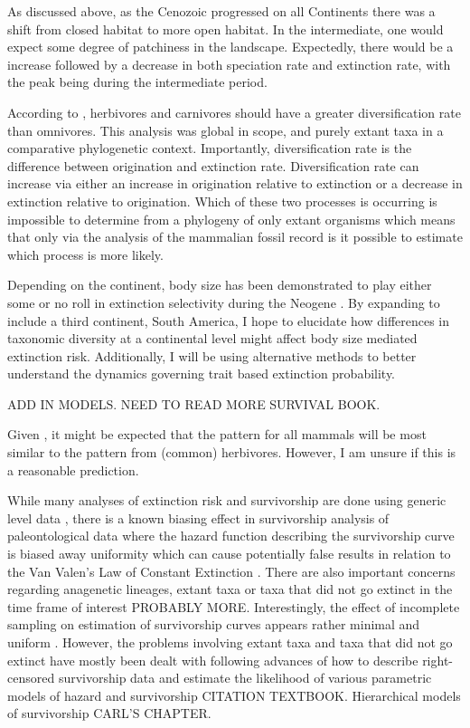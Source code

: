 \documentclass[12pt,letterpaper]{article}
\begin{document}
As discussed above, as the Cenozoic progressed on all Continents there was a shift from closed habitat to more open habitat. In the intermediate, one would expect some degree of patchiness in the landscape. Expectedly, there would be a increase followed by a decrease in both speciation rate and extinction rate, with the peak being during the intermediate period.

According to \citet{Price2012}, herbivores and carnivores should have a greater diversification rate than omnivores. This analysis was global in scope, and purely extant taxa in a comparative phylogenetic context. Importantly, diversification rate is the difference between origination and extinction rate. Diversification rate can increase via either an increase in origination relative to extinction or a decrease in extinction relative to origination. Which of these two processes is occurring is impossible to determine from a phylogeny of only extant organisms \citep{Rabosky2010a} which means that only via the analysis of the mammalian fossil record is it possible to estimate which process is more likely. 

Depending on the continent, body size has been demonstrated to play either some or no roll in extinction selectivity during the Neogene \citep{Tomiya2013,Liow2008,Liow2009}. By expanding to include a third continent, South America, I hope to elucidate how differences in taxonomic diversity at a continental level might affect body size mediated extinction risk. Additionally, I will be using alternative methods to better understand the dynamics governing trait based extinction probability.

ADD IN MODELS. NEED TO READ MORE SURVIVAL BOOK.

Given \citep{Jernvall2002}, it might be expected that the pattern for all mammals will be most similar to the pattern from (common) herbivores. However, I am unsure if this is a reasonable prediction.

While many analyses of extinction risk and survivorship are done using generic level data \citep{Tomiya2013,Liow2008,Harnik2013}, there is a known biasing effect in survivorship analysis of paleontological data where the hazard function describing the survivorship curve is biased away uniformity \citep{Raup1975,Sepkoski1975} which can cause potentially false results in relation to the Van Valen's Law of Constant Extinction \citep{VanValen1973}. There are also important concerns regarding anagenetic lineages, extant taxa or taxa that did not go extinct in the time frame of interest \citep{Raup1975,VanValen1979} PROBABLY MORE. Interestingly, the effect of incomplete sampling on estimation of survivorship curves appears rather minimal and uniform \citep{Sepkoski1975}. However, the problems involving extant taxa and taxa that did not go extinct have mostly been dealt with following advances of how to describe right-censored survivorship data and estimate the likelihood of various parametric models of hazard and survivorship CITATION TEXTBOOK. Hierarchical models of survivorship CARL'S CHAPTER.
\end{document}
